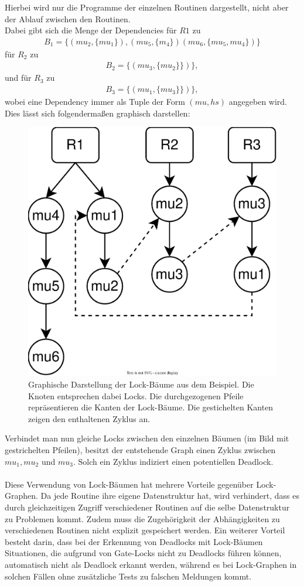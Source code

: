 Hierbei wird nur die Programme der einzelnen Routinen dargestellt, 
nicht aber der Ablauf zwischen den Routinen.\\
Dabei gibt sich die Menge der Dependencies für $R1$ zu 
\begin{align*}
    B_1 = \{(mu_2, \{mu_1\}), (mu_5, \{m_4\})(mu_6, \{mu_5, mu_4\})\}
\end{align*}
für $R_2$ zu 
\begin{align*}
    B_2 = \{(mu_3, \{mu_2\}\})\},
\end{align*}
und für $R_3$ zu 
\begin{align*}
    B_3 = \{(mu_1, \{mu_3\}\})\},
\end{align*} wobei eine Dependency immer als Tuple der Form $(mu, hs)$ angegeben 
wird. Dies lässt sich folgendermaßen graphisch darstellen:
\begin{figure}[H]
    \centering
    \includegraphics[width=.47\textwidth]{img/tree_example.eps}
    \caption{Graphische Darstellung der Lock-Bäume aus dem Beispiel. Die Knoten 
    entsprechen dabei Locks. Die durchgezogenen Pfeile repräsentieren die Kanten 
    der Lock-Bäume. Die gestichelten Kanten zeigen den enthaltenen Zyklus an.}
\end{figure}
Verbindet man nun 
gleiche Locks zwischen den einzelnen Bäumen (im Bild mit gestrichelten Pfeilen),
besitzt der entstehende Graph einen Zyklus zwischen $mu_1, mu_2$ und $mu_3$. 
Solch ein Zyklus indiziert einen potentiellen Deadlock.\\\\
Diese Verwendung von Lock-Bäumen hat mehrere Vorteile gegenüber Lock-Graphen. 
Da jede Routine ihre 
eigene Datenstruktur hat, wird verhindert, dass es durch 
gleichzeitigen Zugriff verschiedener Routinen auf die selbe Datenstruktur zu 
Problemen kommt. Zudem muss die Zugehörigkeit der Abhängigkeiten zu 
verschiedenen Routinen nicht explizit gespeichert werden. Ein weiterer Vorteil 
besteht darin, dass bei der Erkennung von Deadlocks mit Lock-Bäumen Situationen,
die aufgrund von Gate-Locks nicht zu Deadlocks führen können, automatisch nicht
als Deadlock erkannt werden, während es bei Lock-Graphen in solchen Fällen ohne 
zusätzliche Tests zu falschen Meldungen kommt.  

